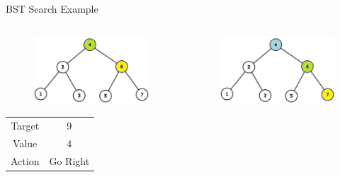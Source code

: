 \documentclass[aspectratio=169]{beamer}%
\begin{document}
\begin{frame}{BST Search Example}
    \begin{columns}
         \begin{column}{0.32\textwidth}
             \begin{figure}[ht]
                 \centering
                 \includegraphics[width = 0.9\linewidth]{bst_src1.png}
             \end{figure}
             \begin{table}[ht]
                 \centering
                 \begin{tabular}{cc}
                    Target & 9\\
                    Value  & 4\\
                    Action & Go Right\\
                 \end{tabular}
             \end{table}
         \end{column}
         \hfill
         \begin{column}{0.32\textwidth}
             \begin{figure}[ht]
                 \centering
                 \includegraphics[width = 0.9\linewidth]{bst_src2.png}

\end{figure}
\end{column}
\end{columns}
\end{frame}
\end{document}
